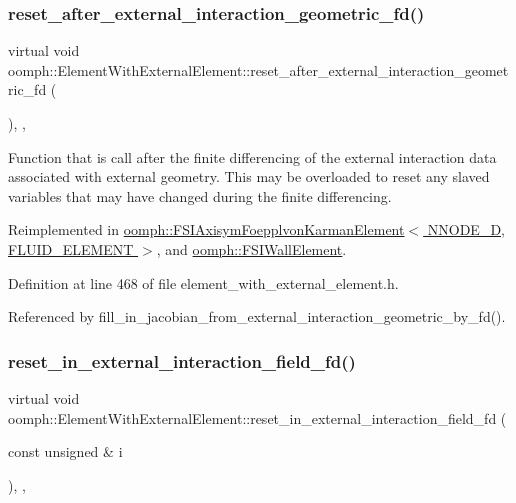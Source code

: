 \subsubsection{\texorpdfstring{reset\+\_\+after\+\_\+external\+\_\+interaction\+\_\+geometric\+\_\+fd()}{reset\_after\_external\_interaction\_geometric\_fd()}}
{\footnotesize\ttfamily virtual void oomph\+::\+Element\+With\+External\+Element\+::reset\+\_\+after\+\_\+external\+\_\+interaction\+\_\+geometric\+\_\+fd (\begin{DoxyParamCaption}{ }\end{DoxyParamCaption})\hspace{0.3cm}{\ttfamily [inline]}, {\ttfamily [protected]}, {\ttfamily [virtual]}}



Function that is call after the finite differencing of the external interaction data associated with external geometry. This may be overloaded to reset any slaved variables that may have changed during the finite differencing. 



Reimplemented in \hyperlink{classoomph_1_1FSIAxisymFoepplvonKarmanElement_a1c8b7e327f305f8399e4d9a2d5deddff}{oomph\+::\+F\+S\+I\+Axisym\+Foepplvon\+Karman\+Element$<$ N\+N\+O\+D\+E\+\_\+D, F\+L\+U\+I\+D\+\_\+\+E\+L\+E\+M\+E\+N\+T $>$}, and \hyperlink{classoomph_1_1FSIWallElement_ad1d147ea9d6f49f7d0507d783d7572e2}{oomph\+::\+F\+S\+I\+Wall\+Element}.



Definition at line 468 of file element\+\_\+with\+\_\+external\+\_\+element.\+h.



Referenced by fill\+\_\+in\+\_\+jacobian\+\_\+from\+\_\+external\+\_\+interaction\+\_\+geometric\+\_\+by\+\_\+fd().

\mbox{\label{classoomph_1_1ElementWithExternalElement_a4ee53afaf9a09c5e2e5cbc488ca7cd7f}} 
\subsubsection{\texorpdfstring{reset\+\_\+in\+\_\+external\+\_\+interaction\+\_\+field\+\_\+fd()}{reset\_in\_external\_interaction\_field\_fd()}}
{\footnotesize\ttfamily virtual void oomph\+::\+Element\+With\+External\+Element\+::reset\+\_\+in\+\_\+external\+\_\+interaction\+\_\+field\+\_\+fd (\begin{DoxyParamCaption}\item[{const unsigned \&}]{i }\end{DoxyParamCaption})\hspace{0.3cm}{\ttfamily [inline]}, {\ttfamily [protected]}, {\ttfamily [virtual]}}



